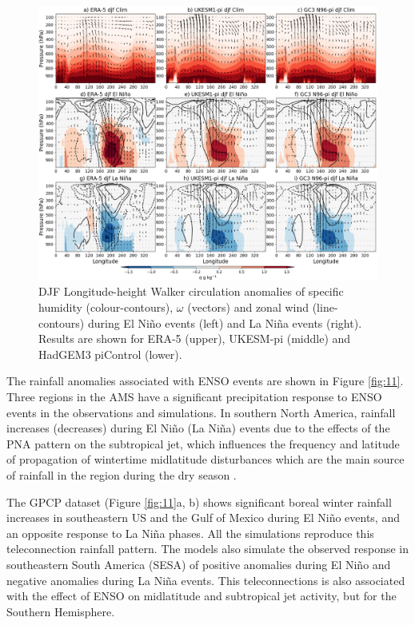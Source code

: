 \begin{figure}
\includegraphics[width=\linewidth]{figures/walkerfinal}
\caption[Walker circulation anomalies associated with ENSO]{DJF Longitude-height Walker circulation anomalies of specific humidity (colour-contours), $\omega$ (vectors) and zonal wind (line-contours) during El Niño events (left) and La Niña events (right). Results are shown for ERA-5 (upper), UKESM-pi (middle) and HadGEM3 piControl (lower).}
\label{fig:swalker}
\end{figure}


The rainfall anomalies associated with ENSO events are shown in Figure \ref{fig:11}. Three regions in the AMS have a significant precipitation response to ENSO events in the observations and simulations.
In southern North America, rainfall increases (decreases) during El Ni\~no (La Ni\~na) events due to the effects of the PNA pattern on the subtropical jet, which influences the frequency and latitude of propagation of wintertime midlatitude disturbances which are the main source of rainfall in the region during the dry season \citep{vera2006,bayr2019}.


The GPCP dataset (Figure \ref{fig:11}a, b) shows significant boreal winter rainfall increases in southeastern US and the Gulf of Mexico during El Ni\~no events, and an opposite response to La Ni\~na phases. All the simulations reproduce this teleconnection rainfall pattern. 
The models also simulate the observed response in southeastern South America (SESA) of positive anomalies during El Ni\~no and negative anomalies during La Ni\~na events. This teleconnections is also associated with the effect of ENSO on midlatitude and subtropical jet activity, but for the Southern Hemisphere.


